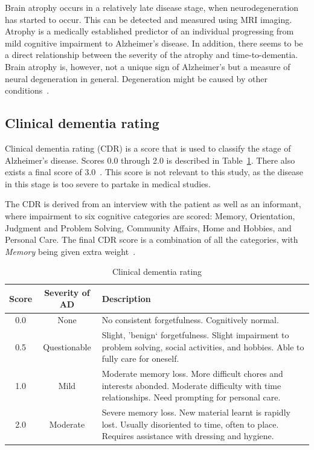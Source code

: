 \documentclass{kththesis}
\renewcommand{\arraystretch}{1.2}
\begin{document}
Brain atrophy occurs in a relatively late disease stage, when neurodegeneration has started to occur. This can be detected and measured using MRI imaging. Atrophy is a medically established predictor of an individual progressing from mild cognitive impairment to Alzheimer's disease. In addition, there seems to be a direct relationship between the severity of the atrophy and time-to-dementia. Brain atrophy is, however, not a unique sign of Alzheimer's but a measure of neural degeneration in general. Degeneration might be caused by other conditions~\cite{jack2010brain}.

\subsection{Clinical dementia rating}
Clinical dementia rating (CDR) is a score that is used to classify the stage of Alzheimer’s disease. Scores 0.0 through 2.0 is described in Table~\ref{tab:cdr_definition}. There also exists a final score of 3.0~\cite{cdr}. This score is not relevant to this study, as the disease in this stage is too severe to partake in medical studies.

The CDR is derived from an interview with the patient as well as an informant, where impairment to six cognitive categories are scored: Memory, Orientation, Judgment and Problem Solving, Community Affairs, Home and Hobbies, and Personal Care. The final CDR score is a combination of all the categories, with \textit{Memory} being given extra weight~\cite{cdr}.

\begin{table}[h]
  \renewcommand{\arraystretch}{1.2}
  \begin{center}
    \caption{Clinical dementia rating}
    \label{tab:cdr_definition}
    \begin{tabularx}{\textwidth}{c|cX}
      \textbf{Score} & \textbf{Severity of AD} & \textbf{Description} \\
      \toprule
      0.0 & None & No consistent forgetfulness. Cognitively normal. \\
      0.5 & Questionable & Slight, 'benign` forgetfulness. Slight impairment to problem solving, social activities, and hobbies. Able to fully care for oneself. \\
      1.0 & Mild & Moderate memory loss. More difficult chores and interests abonded. Moderate difficulty with time relationships. Need prompting for personal care. \\
      2.0 & Moderate & Severe memory loss. New material learnt is rapidly lost. Usually disoriented to time, often to place. Requires assistance with dressing and hygiene. \\
    \end{tabularx}
  \end{center}
\end{table}
\end{document}
